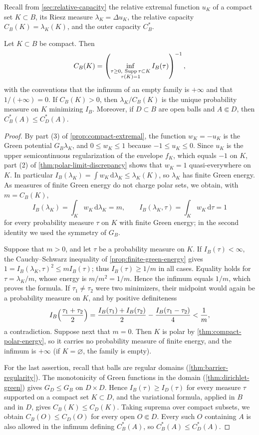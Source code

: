 Recall from \cref{sec:relative-capacity} the relative extremal function $u_K$ of a compact set $K\subset B$, its Riesz measure $\lambda_K=\Delta u_K$, the relative capacity $C_B(K)=\lambda_K(K)$, and the outer capacity $C_B^*$.

\begin{proposition}\label{prop:relative-capacity-variational}
Let $K\subset B$ be compact. Then
\[
 C_B(K)=\left(\inf_{\substack{\tau\geq0,\ \Supp\tau\subset K\\\tau(K)=1}} I_B(\tau)\right)^{-1},
\]
with the conventions that the infimum of an empty family is $+\infty$ and that $1/(+\infty)=0$. If $C_B(K)>0$, then $\lambda_K/C_B(K)$ is the unique probability measure on $K$ minimizing $I_B$. Moreover, if $D\subset B$ are open balls and $A\Subset D$, then $C_B^*(A)\leq C_D^*(A)$.
\end{proposition}
\begin{proof}
By part (3) of \cref{prop:compact-extremal}, the function $w_K=-u_K$ is the Green potential $G_B\lambda_K$, and $0\leq w_K\leq1$ because $-1\leq u_K\leq0$. Since $u_K$ is the upper semicontinuous regularization of the envelope $f_K$, which equals $-1$ on $K$, part (2) of \cref{thm:polar-limit-discrepancy} shows that $w_K=1$ quasi-everywhere on $K$. In particular $I_B(\lambda_K)=\int w_K\,\mathrm d\lambda_K\leq\lambda_K(K)$, so $\lambda_K$ has finite Green energy. As measures of finite Green energy do not charge polar sets, we obtain, with $m=C_B(K)$,
\[
 I_B(\lambda_K)=\int_Kw_K\,\mathrm d\lambda_K=m,\qquad I_B(\lambda_K,\tau)=\int_Kw_K\,\mathrm d\tau=1
\]
for every probability measure $\tau$ on $K$ with finite Green energy; in the second identity we used the symmetry of $G_B$.

Suppose that $m>0$, and let $\tau$ be a probability measure on $K$. If $I_B(\tau)<\infty$, the Cauchy--Schwarz inequality of \cref{prop:finite-green-energy} gives $1=I_B(\lambda_K,\tau)^2\leq mI_B(\tau)$; thus $I_B(\tau)\geq1/m$ in all cases. Equality holds for $\tau=\lambda_K/m$, whose energy is $m/m^2=1/m$. Hence the infimum equals $1/m$, which proves the formula. If $\tau_1\neq\tau_2$ were two minimizers, their midpoint would again be a probability measure on $K$, and by positive definiteness
\[
 I_B\Bigl(\frac{\tau_1+\tau_2}{2}\Bigr)=\frac{I_B(\tau_1)+I_B(\tau_2)}{2}-\frac{I_B(\tau_1-\tau_2)}{4}<\frac1m,
\]
a contradiction. Suppose next that $m=0$. Then $K$ is polar by \cref{thm:compact-polar-energy}, so it carries no probability measure of finite energy, and the infimum is $+\infty$ (if $K=\varnothing$, the family is empty).

For the last assertion, recall that balls are regular domains (\cref{thm:barrier-regularity}). The monotonicity of Green functions in the domain (\cref{thm:dirichlet-green}) gives $G_D\leq G_B$ on $D\times D$. Hence $I_B(\tau)\geq I_D(\tau)$ for every measure $\tau$ supported on a compact set $K\subset D$, and the variational formula, applied in $B$ and in $D$, gives $C_B(K)\leq C_D(K)$. Taking suprema over compact subsets, we obtain $C_B(O)\leq C_D(O)$ for every open $O\Subset D$. Every such $O$ containing $A$ is also allowed in the infimum defining $C_B^*(A)$, so $C_B^*(A)\leq C_D^*(A)$.
\end{proof}

